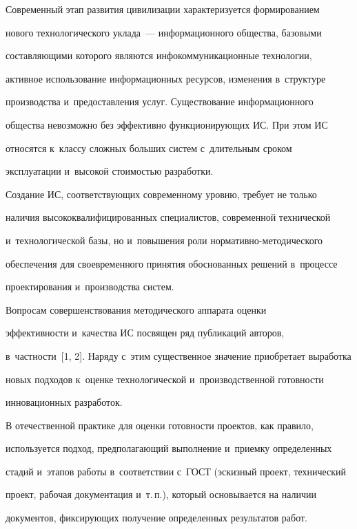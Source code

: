   Современный этап развития цивилизации характеризуется формированием 

нового технологического уклада~--- информационного общества, базовыми 

составляющими которого являются инфокоммуникационные технологии, 

активное использование информационных ресурсов, изменения в~структуре 

производства и~предоставления услуг. Существование информационного 

общества невозможно без эффективно функционирующих ИС. При этом ИС 

относятся к~классу сложных больших систем с~длительным сроком 

эксплуатации и~высокой стоимостью разработки. 

  

  Создание ИС, соответствующих современному уровню, требует не только 

наличия высококвалифицированных специалистов, современной технической 

и~технологической базы, но и~повышения роли нормативно-методического 

обеспечения для своевременного принятия обоснованных решений в~процессе 

проектирования и~производства систем. 

  

  Вопросам совершенствования методического аппарата оценки 

эффективности и~качества ИС посвящен ряд публикаций авторов, 

в~частности~[1, 2]. Наряду с~этим существенное значение приобретает выработка 

новых подходов к~оценке технологической и~производственной готовности 

инновационных разработок.

  

  В отечественной практике для оценки готовности проектов, как правило, 

используется подход, предполагающий выполнение и~приемку определенных 

стадий и~этапов работы в~соответствии с~ГОСТ (эскизный проект, технический 

проект, рабочая документация и~т.\,п.), который основывается на наличии 

документов, фиксирующих получение определенных результатов работ.

  

